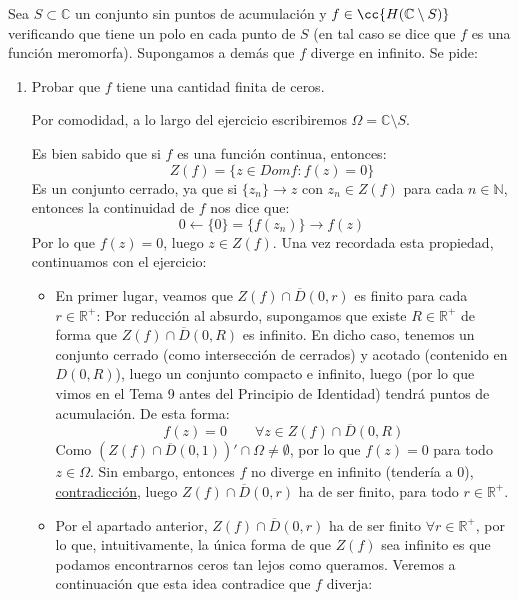 \documentclass[12pt]{article}
\begin{document}
    \begin{ejercicio}[2.5 puntos]
        Sea $S\subset \mathbb{C}$ un conjunto sin puntos de acumulación y $f\in \cc{H(\mathbb{C}\setminus S)}$ verificando que tiene un polo en cada punto de $S$ (en tal caso se dice que $f$ es una función meromorfa). Supongamos a demás que $f$ diverge en infinito. Se pide:
        \begin{enumerate}[label=\alph*)]
            \item Probar que $f$ tiene una cantidad finita de ceros.

                Por comodidad, a lo largo del ejercicio escribiremos $\Omega=\mathbb{C}\setminus S$.

                Es bien sabido que si $f$ es una función continua, entonces:
                \begin{equation*}
                    Z(f) = \{z\in Domf : f(z) = 0\}
                \end{equation*}
                Es un conjunto cerrado, ya que si $\{z_n\}\to z$ con $z_n\in Z(f)$ para cada $n\in \mathbb{N}$, entonces la continuidad de $f$ nos dice que:
                \begin{equation*}
                    0 \leftarrow \{0\} = \{f(z_n)\} \to f(z)
                \end{equation*}
                Por lo que $f(z) = 0$, luego $z\in Z(f)$. Una vez recordada esta propiedad, continuamos con el ejercicio:

                \begin{itemize}
                    \item En primer lugar, veamos que $Z(f)\cap \overline{D}(0,r)$ es finito para cada $r\in \mathbb{R}^+$: Por reducción al absurdo, supongamos que existe $R\in \mathbb{R}^+$ de forma que $Z(f)\cap \overline{D}(0,R)$ es infinito. En dicho caso, tenemos un conjunto cerrado (como intersección de cerrados) y acotado (contenido en $D(0,R)$), luego un conjunto compacto e infinito, luego (por lo que vimos en el Tema 9 antes del Principio de Identidad) tendrá puntos de acumulación. De esta forma:
                        \begin{equation*}
                            f(z) = 0 \qquad \forall z\in Z(f)\cap \overline{D}(0,R)
                        \end{equation*}
                        Como $(Z(f)\cap \overline{D}(0,1))' \cap \Omega \neq \emptyset $, por lo que $f(z) = 0$ para todo $z\in \Omega$. Sin embargo, entonces $f$ no diverge en infinito (tendería a 0), \underline{contradicción}, luego $Z(f)\cap \overline{D}(0,r)$ ha de ser finito, para todo $r\in \mathbb{R}^+$.
                    \item Por el apartado anterior, $Z(f)\cap \overline{D}(0,r)$ ha de ser finito $\forall r\in \mathbb{R}^+$, por lo que, intuitivamente, la única forma de que $Z(f)$ sea infinito es que podamos encontrarnos ceros tan lejos como queramos. Veremos a continuación que esta idea contradice que $f$ diverja:


\end{itemize}
\end{enumerate}
\end{ejercicio}
\end{document}
